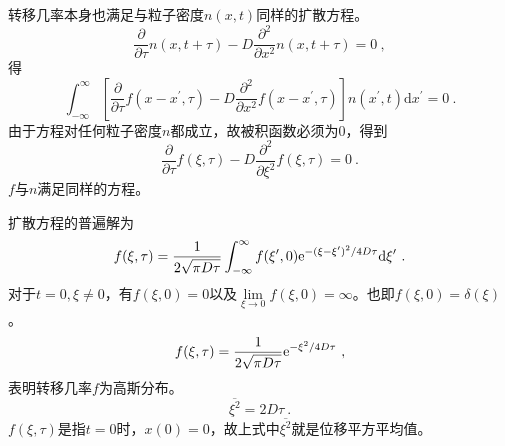 \documentclass[11pt,a4paper]{article}
\newcommand{\dif}{\mathrm{d}}
\begin{document}
转移几率本身也满足与粒子密度$n(x,t)$同样的扩散方程。
\begin{equation}
\dfrac{\partial }{\partial \tau} n(x, t+\tau) - D\dfrac{\partial^2 }{\partial x^2} n(x, t+\tau) = 0 ~,
\end{equation}
得
\begin{equation}
\int_{-\infty}^\infty \left[\dfrac{\partial }{\partial \tau} f(x-x^\prime, \tau) - D \dfrac{\partial^2 }{\partial x^2} f(x-x^\prime, \tau) \right] n(x^\prime, t) \dif x^\prime = 0 ~.
\end{equation}
由于方程对任何粒子密度$n$都成立，故被积函数必须为$0$，得到
\begin{equation}
\dfrac{\partial }{\partial \tau} f(\xi, \tau) - D \dfrac{\partial^2 }{\partial \xi^2} f(\xi, \tau) = 0 ~.
\end{equation}
$f$与$n$满足同样的方程。

扩散方程的普遍解为
\begin{equation}
 f(\xi, \tau) = \dfrac{1}{2\sqrt{\pi D \tau}} \int_{-\infty}^\infty f(\xi^\prime, 0) {\rm e}^{-(\xi -\xi^\prime)^2/4D \tau} \dif \xi^\prime ~.
\end{equation}
对于$t=0, \xi \neq 0$，有$f(\xi, 0) =0$以及$\underset{\xi \rightarrow 0}\lim f(\xi, 0) = \infty$。也即$f(\xi, 0) = \delta(\xi)$。
\begin{equation}
 f(\xi, \tau) = \dfrac{1}{2\sqrt{\pi D \tau}} {\rm e}^{-\xi^2/4D \tau} ~,
\end{equation}
表明转移几率$f$为高斯分布。
\begin{equation}
\overline{\xi^2} = 2D\tau ~.
\end{equation}
$f(\xi, \tau)$是指$t=0$时，$x(0) = 0$，故上式中$\overline{\xi^2}$就是位移平方平均值。
\end{document}
